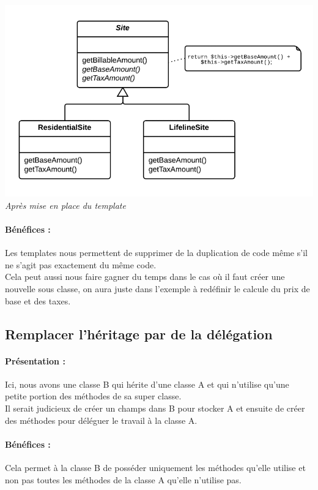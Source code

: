 \documentclass[a4paper,twoside,12pt,openright]{report}
\begin{document}
\begin{center}
\includegraphics[scale=0.75]{Image/Template2.png}\\
\itshape{Après mise en place du template \cite{ref5}}
\end{center}

\paragraph{Bénéfices :}
Les templates nous permettent de supprimer de la duplication de code même s'il ne s'agit pas exactement du même code.\\
Cela peut aussi nous faire gagner du temps dans le cas où il faut créer une nouvelle sous classe, on aura juste dans l'exemple à redéfinir le calcule du prix de base et des taxes.\\

\subsection{Remplacer l'héritage par de la délégation}
\paragraph{Présentation :}
Ici, nous avons une classe B qui hérite d'une classe A et qui n'utilise qu'une petite portion des méthodes de sa super classe.\\
Il serait judicieux de créer un champs dans B pour stocker A et ensuite de créer des méthodes pour déléguer le travail à la classe A.

\paragraph{Bénéfices :}
Cela permet à la classe B de posséder uniquement les méthodes qu'elle utilise et non pas toutes les méthodes de la classe A qu'elle n'utilise pas.
\end{document}

